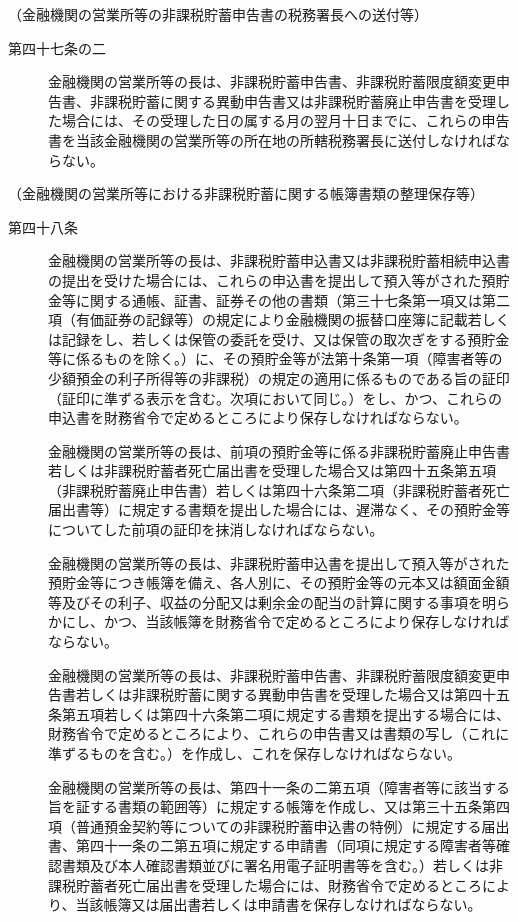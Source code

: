 \documentclass[twocolumn,a4j,10pt]{ltjtarticle}
\begin{document}
\noindent\hspace{10pt}（金融機関の営業所等の非課税貯蓄申告書の税務署長への送付等）
\begin{description}
\item[第四十七条の二]金融機関の営業所等の長は、非課税貯蓄申告書、非課税貯蓄限度額変更申告書、非課税貯蓄に関する異動申告書又は非課税貯蓄廃止申告書を受理した場合には、その受理した日の属する月の翌月十日までに、これらの申告書を当該金融機関の営業所等の所在地の所轄税務署長に送付しなければならない。
\end{description}
\noindent\hspace{10pt}（金融機関の営業所等における非課税貯蓄に関する帳簿書類の整理保存等）
\begin{description}
\item[第四十八条]金融機関の営業所等の長は、非課税貯蓄申込書又は非課税貯蓄相続申込書の提出を受けた場合には、これらの申込書を提出して預入等がされた預貯金等に関する通帳、証書、証券その他の書類（第三十七条第一項又は第二項（有価証券の記録等）の規定により金融機関の振替口座簿に記載若しくは記録をし、若しくは保管の委託を受け、又は保管の取次ぎをする預貯金等に係るものを除く。）に、その預貯金等が法第十条第一項（障害者等の少額預金の利子所得等の非課税）の規定の適用に係るものである旨の証印（証印に準ずる表示を含む。次項において同じ。）をし、かつ、これらの申込書を財務省令で定めるところにより保存しなければならない。
\item[]金融機関の営業所等の長は、前項の預貯金等に係る非課税貯蓄廃止申告書若しくは非課税貯蓄者死亡届出書を受理した場合又は第四十五条第五項（非課税貯蓄廃止申告書）若しくは第四十六条第二項（非課税貯蓄者死亡届出書等）に規定する書類を提出した場合には、遅滞なく、その預貯金等についてした前項の証印を抹消しなければならない。
\item[]金融機関の営業所等の長は、非課税貯蓄申込書を提出して預入等がされた預貯金等につき帳簿を備え、各人別に、その預貯金等の元本又は額面金額等及びその利子、収益の分配又は剰余金の配当の計算に関する事項を明らかにし、かつ、当該帳簿を財務省令で定めるところにより保存しなければならない。
\item[]金融機関の営業所等の長は、非課税貯蓄申告書、非課税貯蓄限度額変更申告書若しくは非課税貯蓄に関する異動申告書を受理した場合又は第四十五条第五項若しくは第四十六条第二項に規定する書類を提出する場合には、財務省令で定めるところにより、これらの申告書又は書類の写し（これに準ずるものを含む。）を作成し、これを保存しなければならない。
\item[]金融機関の営業所等の長は、第四十一条の二第五項（障害者等に該当する旨を証する書類の範囲等）に規定する帳簿を作成し、又は第三十五条第四項（普通預金契約等についての非課税貯蓄申込書の特例）に規定する届出書、第四十一条の二第五項に規定する申請書（同項に規定する障害者等確認書類及び本人確認書類並びに署名用電子証明書等を含む。）若しくは非課税貯蓄者死亡届出書を受理した場合には、財務省令で定めるところにより、当該帳簿又は届出書若しくは申請書を保存しなければならない。

\end{description}
\end{document}
